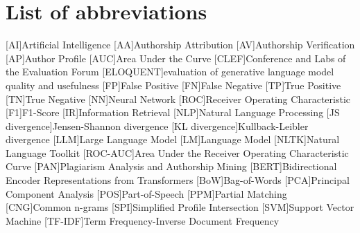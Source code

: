 \chapter*{List of abbreviations}

\begin{acronym}[XXXXXXXXX]
    [AI]{Artificial Intelligence}
    [AA]{Authorship Attribution}
    [AV]{Authorship Verification}
    [AP]{Author Profile}
    [AUC]{Area Under the Curve}
    [CLEF]{Conference and Labs of the Evaluation Forum}
    [ELOQUENT]{evaluation of generative language model quality and usefulness}
    [FP]{False Positive}
    [FN]{False Negative}
    [TP]{True Positive}
    [TN]{True Negative}
    [NN]{Neural Network}
    [ROC]{Receiver Operating Characteristic}
    [F1]{F1-Score}
    [IR]{Information Retrieval}
    [NLP]{Natural Language Processing}
    [JS divergence]{Jensen-Shannon divergence}
    [KL divergence]{Kullback-Leibler divergence}
    [LLM]{Large Language Model}
    [LM]{Language Model}
    [NLTK]{Natural Language Toolkit}
    [ROC-AUC]{Area Under the Receiver Operating Characteristic Curve}
    [PAN]{Plagiarism Analysis and Authorship Mining} %
    [BERT]{Bidirectional Encoder Representations from Transformers}
    [BoW]{Bag-of-Words}
    [PCA]{Principal Component Analysis}
    [POS]{Part-of-Speech}
    [PPM]{Partial Matching}
    [CNG]{Common n-grams}
    [SPI]{Simplified Profile Intersection}
    [SVM]{Support Vector Machine}
    [TF-IDF]{Term Frequency-Inverse Document Frequency}

\end{acronym}
